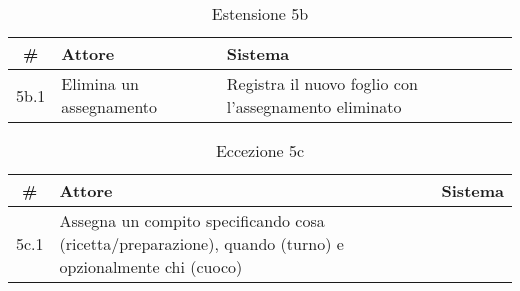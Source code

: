\begin{table}[H]\centering\caption*{Estensione 5b}
    \small
    \begin{tabular}{|c|p{7cm}|p{6.23cm}|}
        \hline\bfseries \# & \bfseries Attore        & \bfseries Sistema                                     \\\hline
        5b.1               & Elimina un assegnamento & Registra il nuovo foglio con l’assegnamento eliminato \\\hline
    \end{tabular}
\end{table}

\begin{table}[H]\centering\color{red}\caption*{Eccezione 5c}
    \small
    \begin{tabular}{|c|p{7cm}|p{6.23cm}|}
        \hline\bfseries \# & \bfseries Attore                                                                                        & \bfseries Sistema                                 \\\hline
        5c.1               & Assegna un compito specificando cosa (ricetta/preparazione), quando (turno) e opzionalmente chi (cuoco) & \color{red}{Cuoco non disponibile nel dato turno} \\\hline
    \end{tabular}
\end{table}